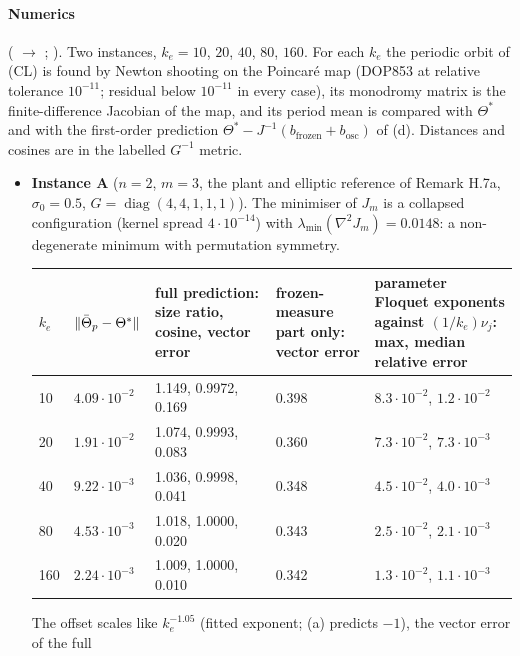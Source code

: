 \paragraph{Numerics} ( $\to$ ;
). Two instances, $k_e = 10$, $20$, $40$, $80$, $160$. For each $k_e$ the periodic orbit
of (CL) is found by Newton shooting on the Poincaré map (DOP853 at relative tolerance $10^{-11}$; residual below
$10^{-11}$ in every case), its monodromy matrix is the finite-difference Jacobian of the map, and its period mean is
compared with $\Theta^*$ and with the first-order prediction $\Theta^* - J^{-1}(b_{\mathrm{frozen}} + b_{\mathrm{osc}})$
of (d). Distances and cosines are in the labelled $G^{-1}$ metric.
\begin{itemize}
  \item \textbf{Instance A} ($n = 2$, $m = 3$, the plant and elliptic reference of Remark H.7a, $\sigma_0 = 0.5$,
    $G = \operatorname{diag}(4,4,1,1,1)$). The minimiser of $J_m$ is a collapsed configuration (kernel spread
    $4\cdot10^{-14}$) with $\lambda_{\min}(\nabla^2J_m) = 0.0148$: a non-degenerate minimum with permutation symmetry.
    \begin{center}
    \small
    \begin{tabularx}{\linewidth}{@{}llYYY@{}}
    \toprule
    $k_e$ & $\lVert \bar\Theta_p - \Theta^*\rVert$ & full prediction: size ratio, cosine, vector error
      & frozen-measure part only: vector error
      & parameter Floquet exponents against $(1/k_e)\nu_j$: max, median relative error\\
      & $4.09\cdot10^{-2}$ & 1.149, 0.9972, 0.169 & 0.398 & $8.3\cdot10^{-2}$, $1.2\cdot10^{-2}$\\
    20  & $1.91\cdot10^{-2}$ & 1.074, 0.9993, 0.083 & 0.360 & $7.3\cdot10^{-2}$, $7.3\cdot10^{-3}$\\
    40  & $9.22\cdot10^{-3}$ & 1.036, 0.9998, 0.041 & 0.348 & $4.5\cdot10^{-2}$, $4.0\cdot10^{-3}$\\
    80  & $4.53\cdot10^{-3}$ & 1.018, 1.0000, 0.020 & 0.343 & $2.5\cdot10^{-2}$, $2.1\cdot10^{-3}$\\
    160 & $2.24\cdot10^{-3}$ & 1.009, 1.0000, 0.010 & 0.342 & $1.3\cdot10^{-2}$, $1.1\cdot10^{-3}$\\
    \bottomrule
    \end{tabularx}
    \end{center}
    The offset scales like $k_e^{-1.05}$ (fitted exponent; (a) predicts $-1$), the vector error of the full

\end{itemize}

